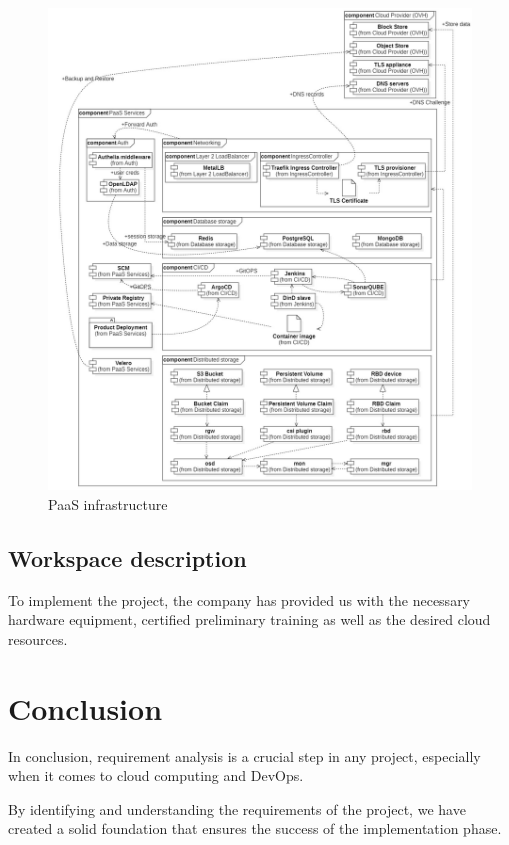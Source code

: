 \begin{figure}[H]\centering
\includegraphics[width=1.0\textwidth,angle=00]{assets/f8.jpg}
\caption{PaaS infrastructure}
\label{fig:f8}
\end{figure}

\subsection{Workspace description}

To implement the project, the company has provided us with the necessary hardware equipment, certified preliminary training as well as the desired cloud resources.

\section*{Conclusion}
In conclusion, requirement analysis is a crucial step in any project, especially when it comes to cloud computing and DevOps.  

By identifying and understanding the requirements of the project, we have created a solid foundation that ensures the success of the implementation phase. 


